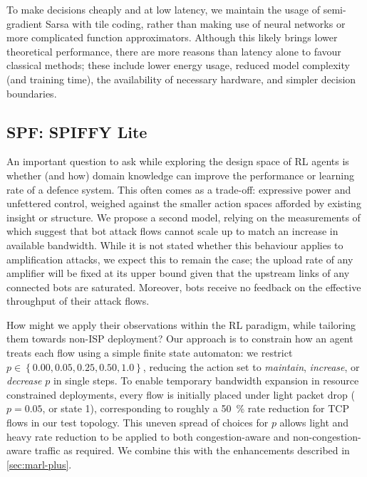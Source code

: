 \documentclass[conference, letterpaper, 10pt, times]{IEEEtran}
\begin{document}
To make decisions cheaply and at low latency, we maintain the usage of semi-gradient Sarsa with tile coding, rather than making use of neural networks or more complicated function approximators.
Although this likely brings lower theoretical performance, there are more reasons than latency alone to favour classical methods; these include lower energy usage, reduced model complexity (and training time), the availability of necessary hardware, and simpler decision boundaries.

\subsection{SPF: SPIFFY Lite}

An important question to ask while exploring the design space of RL agents is whether (and how) domain knowledge can improve the performance or learning rate of a defence system.
This often comes as a trade-off: expressive power and unfettered control, weighed against the smaller action spaces afforded by existing insight or structure.
We propose a second model, relying on the measurements of \textcite{DBLP:conf/ndss/KangGS16} which suggest that bot attack flows cannot scale up to match an increase in available bandwidth.
While it is not stated whether this behaviour applies to amplification attacks, we expect this to remain the case; the upload rate of any amplifier will be fixed at its upper bound given that the upstream links of any connected bots are saturated.
Moreover, bots receive no feedback on the effective throughput of their attack flows.

How might we apply their observations within the RL paradigm, while tailoring them towards non-ISP deployment?
Our approach is to constrain how an agent treats each flow using a simple finite state automaton: we restrict $p \in \left\{ 0.00, 0.05, 0.25, 0.50, 1.0 \right\}$, reducing the action set to \emph{maintain}, \emph{increase}, or \emph{decrease} $p$ in single steps.
To enable temporary bandwidth expansion in resource constrained deployments, every flow is initially placed under light packet drop ($p=0.05$, or state 1), corresponding to roughly a \SI{50}{\percent} rate reduction for TCP flows in our test topology.
This uneven spread of choices for $p$ allows light and heavy rate reduction to be applied to both congestion-aware and non-congestion-aware traffic as required.
We combine this with the enhancements described in \cref{sec:marl-plus}.
\end{document}
